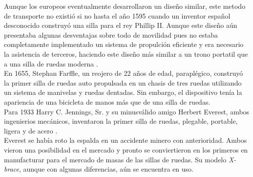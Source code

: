 Aunque los europeos eventualmente desarrollaron un dise\~no similar, este metodo
de transporte no existi\'o si no hasta el a\~no 1595 cuando un inventor
espa\~nol desconocido construy\'o una silla para el rey Phillip II. Aunque este
dise\~no a\'un presentaba algunas desventajas sobre todo de movilidad pues no
estaba completamente implementado un sistema de propulci\'on eficiente y era
necesario la asistencia de terceros, haciendo este dise\~no m\'as similar a un
trono portatil que a una silla de ruedas moderna \parencite{history}.\\
En 1655, Stephan Farffle, un reojero de 22 a\~nos de edad, parapl\'egico,
construy\'o la primer silla de ruedas auto propulsada en un chasis de tres
ruedas utilizando un sistema de manivelas y ruedas dentadas. Sin embargo, el
dispositivo ten\'ia la apariencia de una bicicleta de manos m\'as que de una
silla de ruedas.\\
Para 1933 Harry C. Jennings, Sr. y su minusv\'alido amigo Herbert Everest, ambos
ingenierios mec\'anicos, inventaron la primer silla de ruedas, plegable,
portable, ligera y de acero \parencite{moderna}. \\
Everest se hab\'ia roto la espalda en un accidente minero con anterioridad.
Ambos vieron una posibilidad en el mercado y pronto se conviertieron en los
primeros en manufacturar para el mercado de masas de las sillas de ruedas. Su
modelo \emph{X-brace}, aunque con algunas diferencias, a\'un se encuentra en
uso.





